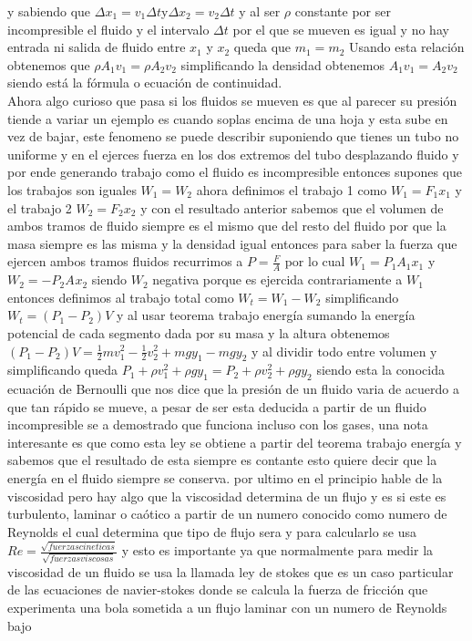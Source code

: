 \documentclass{article}
\begin{document}
y sabiendo que $\Delta {x}_{1} =  {v}_{1}\Delta t$y$\Delta {x}_{2} =  {v}_{2}\Delta t$
y al ser $\rho$ constante por ser incompresible el fluido y el intervalo $\Delta t$ por el que se mueven es igual y no hay entrada ni salida
de fluido entre ${x}_{1}$ y ${x}_{2}$ queda que ${m}_{1}={m}_{2}$
Usando esta relación obtenemos que
$\rho {A}_{1}{v}_{1}=\rho{A}_{2}{v}_{2}$ simplificando la densidad
obtenemos ${A}_{1}{v}_{1}={A}_{2}{v}_{2}$
siendo está la fórmula o ecuación de continuidad.\\
Ahora algo curioso que pasa si los fluidos se mueven es que al parecer su presión tiende a variar
un ejemplo es cuando soplas encima de una hoja y esta sube en vez de bajar,
este fenomeno se puede describir suponiendo que tienes un tubo no uniforme y en el
ejerces fuerza en los dos extremos del tubo desplazando fluido y por ende generando trabajo
como el fluido es incompresible entonces supones que los trabajos son iguales ${W}_{1}={W}_{2}$
ahora definimos el trabajo 1 como ${W}_{1}={F}_{1}{x}_{1}$ y el trabajo 2
${W}_{2}={F}_{2}{x}_{2}$ y con el resultado anterior sabemos que el volumen de ambos tramos
de fluido siempre es el mismo que del resto del fluido por que la masa siempre es las misma y la densidad igual
entonces para saber la fuerza que ejercen ambos tramos fluidos recurrimos a $P=\frac{F}{A}$
por lo cual ${W}_{1}={P}_{1}{A}_{1}{x}_{1}$ y ${W}_{2}=-{P}_{2}{A}_{}{x}_{2}$ siendo ${W}_{2}$ negativa porque 
es ejercida contrariamente a ${W}_{1}$ entonces definimos al trabajo total como
${W}_{t}={W}_{1}-{W}_{2}$
simplificando ${W}_{t}=({P}_{1}-{P}_{2})V$
y al usar teorema trabajo energía sumando la energía potencial de cada segmento dada
por su masa y la altura obtenemos
$({P}_{1}-{P}_{2})V=\frac{1}{2}m{v}_{1}^{2}-\frac{1}{2}{v}_{2}^{2}+mg{y}_{1}-mg{y}_{2}$ y al dividir todo entre volumen y simplificando queda
${P}_{1}+\rho {v}_{1}^{2}+\rho g{y}_{1}={P}_{2}+\rho {v}_{2}^{2}+\rho g{y}_{2}$
siendo esta la conocida ecuación de Bernoulli que nos dice que la presión de un fluido
varia de acuerdo a que tan rápido se mueve, a pesar de ser esta deducida a partir de un fluido
incompresible se a demostrado que funciona incluso con los gases, una nota interesante
es que como esta ley se obtiene a partir del teorema trabajo energía y sabemos que
el resultado de esta siempre es contante esto quiere decir que la energía en el fluido siempre
se conserva.
por ultimo en el principio hable de la viscosidad pero hay algo que la viscosidad 
determina de un flujo y es si este es turbulento, laminar o caótico a partir de un 
numero conocido como numero de Reynolds el cual determina que tipo de flujo sera
y para calcularlo se usa $Re=\frac{\sqrt{fuerzas cineticas}}{\sqrt{fuerzas viscosas}}$
y esto es importante ya que normalmente para medir la viscosidad de un fluido se usa 
la llamada ley de stokes que es un caso particular de las ecuaciones de navier-stokes
donde se calcula la fuerza de fricción que experimenta una bola sometida a un flujo laminar con un numero de Reynolds
bajo
\end{document}
